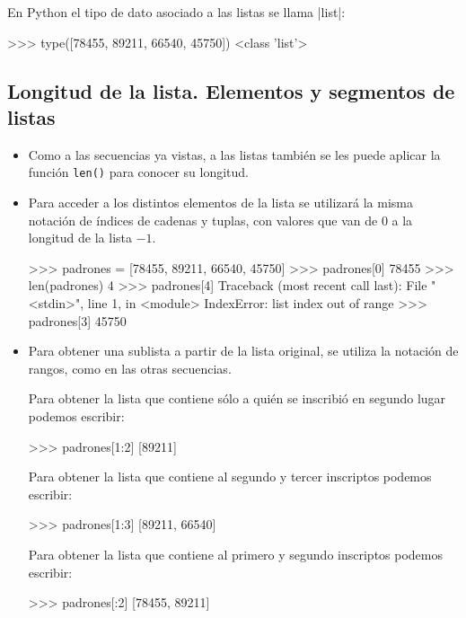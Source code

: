 \begin{observacion}
En Python el tipo de dato asociado a las listas se llama |list|:

\begin{codigo-python-sn}
>>> type([78455, 89211, 66540, 45750])
<class 'list'>
\end{codigo-python-sn}
\end{observacion}

\subsection{Longitud de la lista. Elementos y segmentos de listas}

\begin{itemize}

\item Como a las secuencias ya vistas, a las listas también se les puede
aplicar la función \lstinline+len()+ para conocer su longitud.

\item Para acceder a los distintos elementos de la lista se utilizará la
misma notación de índices de cadenas y tuplas, con valores que van de $0$ a la
longitud de la lista $- 1$.

\begin{codigo-python-sn}
>>> padrones = [78455, 89211, 66540, 45750]
>>> padrones[0]
78455
>>> len(padrones)
4
>>> padrones[4]
Traceback (most recent call last):
  File "<stdin>", line 1, in <module>
IndexError: list index out of range
>>> padrones[3]
45750
\end{codigo-python-sn}

\item Para obtener una sublista a partir de la lista original, se utiliza
la notación de rangos, como en las otras secuencias.

Para obtener la lista que contiene sólo a quién se inscribió en segundo
lugar podemos escribir:

\begin{codigo-python-sn}
>>> padrones[1:2]
[89211]
\end{codigo-python-sn}

Para obtener la lista que contiene al segundo y tercer inscriptos
podemos escribir:

\begin{codigo-python-sn}
>>> padrones[1:3]
[89211, 66540]
\end{codigo-python-sn}

Para obtener la lista que contiene al primero y segundo inscriptos
podemos escribir:

\begin{codigo-python-sn}
>>> padrones[:2]
[78455, 89211]
\end{codigo-python-sn}

\end{itemize}

